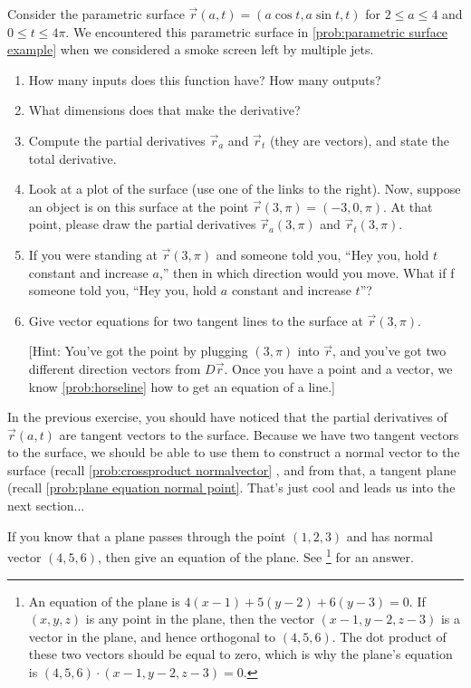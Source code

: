 \begin{problem}
 Consider the parametric surface $\vec r(a,t) = (a\cos t, a\sin t, t)$ for $2\leq a\leq 4$ and $0\leq t\leq 4\pi$. We encountered this parametric surface in \ref{prob:parametric surface example} when we considered a smoke screen left by multiple jets.
\begin{enumerate}
	\item How many inputs does this function have? How many outputs?
	\item What dimensions does that make the derivative?
	\item Compute the partial derivatives $\vec r_a$ and $\vec r_t$ (they are vectors), and state the total derivative.
	\item Look at a plot of the surface (use one of the links to the right). Now, suppose an object is on this surface at the point $\vec r(3,\pi) = (-3,0,\pi)$. At that point, please draw the partial derivatives $\vec r_a(3,\pi)$ and $\vec r_t(3,\pi)$.
 \item If you were standing at $\vec r(3,\pi)$ and someone told you, ``Hey you, hold $t$ constant and increase $a$,'' then in which direction would you move. What if f someone told you, ``Hey you, hold $a$ constant and increase $t$''?
 \item Give vector equations for two tangent lines to the surface at $\vec r(3,\pi)$. 

[Hint: You've got the point by plugging $(3,\pi)$ into $\vec r$, and you've got two different direction vectors from $D\vec r$. Once you have a point and a vector, we know \ref{prob:horseline} how to get an equation of a line.]
\end{enumerate}
  
\end{problem}

In the previous exercise, you should have noticed that the partial derivatives of $\vec r(a,t)$ are tangent vectors to the surface. Because we have two tangent vectors to the surface, we should be able to use them to construct a normal vector to the surface (recall \ref{prob:crossproduct normalvector} , and from that, a tangent plane (recall \ref{prob:plane equation normal point}. That's just cool and leads us into the next section...
\begin{review*}
 If you know that a plane passes through the point $(1,2,3)$ and has normal vector $(4,5,6)$, then give an equation of the plane.  See \footnote{An equation of the plane is $4(x-1)+5(y-2)+6(y-3)=0$. If $(x,y,z)$ is any point in the plane, then the vector $(x-1,y-2,z-3)$ is a vector in the plane, and hence orthogonal to $(4,5,6)$. The dot product of these two vectors should be equal to zero, which is why the plane's equation is $(4,5,6)\cdot (x-1,y-2,z-3)=0$.} for an answer.
\end{review*}

